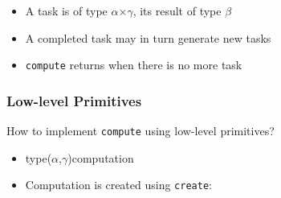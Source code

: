 \documentclass[xcolor=dvipsnames,8pt]{beamer}
\begin{document}
\begin{frame}
\medskip\noindent
  \begin{itemize}
  \item A task is of type \textsf{\ensuremath{\alpha}\hspace*{1.22ex}\ensuremath{\times}\hspace*{1.22ex}\ensuremath{\gamma}}, its result of type
    \textsf{\ensuremath{\beta}}
  \item A completed task may in turn generate new tasks
  \item \texttt{compute} returns when there is no more task
  \end{itemize}
\end{frame}


\begin{frame}\frametitle {Low-level Primitives}
How to implement \texttt{compute} using low-level primitives?
\begin{itemize}
\item \textsf{{\color{blue}type}\hspace*{1.22ex}(\ensuremath{\alpha},\hspace*{1.22ex}\ensuremath{\gamma})\hspace*{1.22ex}computation}
\item Computation is created using \texttt{create}:
\end{itemize}
  

\medskip\noindent
{\colorbox{tmpcolor}{\begin{minipage}{\textwidth}\tt\parindent 0pt


\end{minipage}}}
\end{frame}
\end{document}
